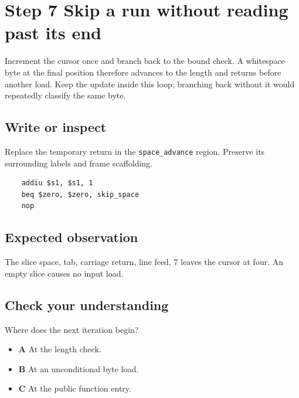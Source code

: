 \section{Step 7 Skip a run without reading past its end}\label{expression-s07}

Increment the cursor once and branch back to the bound check. A whitespace byte at the final position therefore advances to the length and returns before another load. Keep the update inside this loop; branching back without it would repeatedly classify the same byte.

\subsection{Write or inspect}
Replace the temporary return in the \texttt{space\_advance} region. Preserve its surrounding labels and frame scaffolding.

\begin{verbatim}
    addiu $s1, $s1, 1
    beq $zero, $zero, skip_space
    nop
\end{verbatim}
\subsection{Expected observation}
The slice space, tab, carriage return, line feed, 7 leaves the cursor at four. An empty slice causes no input load.

\subsection{Check your understanding}
Where does the next iteration begin?

\begin{itemize}
  \item \textbf{A} At the length check.
  \item \textbf{B} At an unconditional byte load.
  \item \textbf{C} At the public function entry.
\end{itemize}
